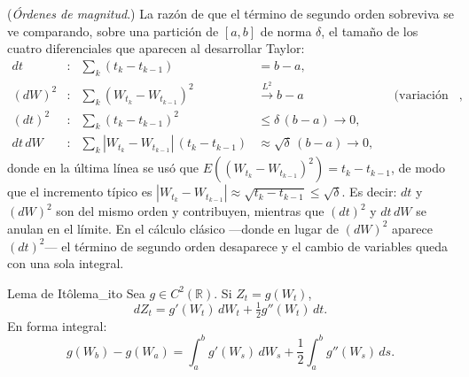 \documentclass[11pt, a4paper]{article}
\begin{document}
\obs (\emph{Órdenes de magnitud}.) La razón de que el término de segundo orden sobreviva se ve
comparando, sobre una partición de $[a, b]$ de norma $\delta$, el tamaño de los cuatro
diferenciales que aparecen al desarrollar Taylor:
\begin{align*}
dt &: & \sum_k (t_k - t_{k-1}) &= b - a, \\
(dW)^2 &: & \sum_k (W_{t_k} - W_{t_{k-1}})^2 &\xrightarrow{L^2} b - a
&& \text{(variación cuadrática)}, \\
(dt)^2 &: & \sum_k (t_k - t_{k-1})^2 &\le \delta \, (b - a) \longrightarrow 0, \\
dt \, dW &: & \sum_k |W_{t_k} - W_{t_{k-1}}| \, (t_k - t_{k-1}) &\approx \sqrt{\delta} \,
(b - a) \longrightarrow 0,
\end{align*}
donde en la última línea se usó que $E((W_{t_k} - W_{t_{k-1}})^2) = t_k - t_{k-1}$, de modo que
el incremento típico es $|W_{t_k} - W_{t_{k-1}}| \approx \sqrt{t_k - t_{k-1}} \le \sqrt{\delta}$.
Es decir: $dt$ y $(dW)^2$ son del mismo orden y contribuyen, mientras que $(dt)^2$ y $dt \, dW$
se anulan en el límite. En el cálculo clásico —donde en lugar de $(dW)^2$ aparece $(dt)^2$— el
término de segundo orden desaparece y el cambio de variables queda con una sola integral.

\begin{teorema}{Lema de Itô}{lema_ito}
Sea $g \in C^2(\mathbb{R})$. Si $Z_t = g(W_t)$,
$$ dZ_t = g'(W_t) \, dW_t + \tfrac{1}{2} g''(W_t) \, dt. $$
En forma integral:
$$ g(W_b) - g(W_a) = \int_a^b g'(W_s) \, dW_s + \frac{1}{2} \int_a^b g''(W_s) \, ds. $$
\end{teorema}
\end{document}
